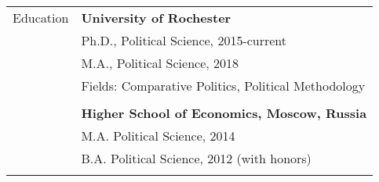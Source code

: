 \documentclass[letterpaper,11pt,oneside]{article}
\begin{document}
\noindent \begin{tabular}{@{} l l}
 \Large{Education}    & \textbf{University of Rochester} \\
     & Ph.D., Political Science, 2015-current \\
     & M.A., Political Science, 2018 \\
     & Fields: Comparative Politics, Political Methodology \\
     \vspace*{-2mm}
     & \\
     & \textbf{Higher School of Economics, Moscow, Russia} \\
     & M.A. Political Science, 2014 \\
     & B.A. Political Science, 2012 (with honors) \\
     & \\


\end{tabular}
\end{document}
